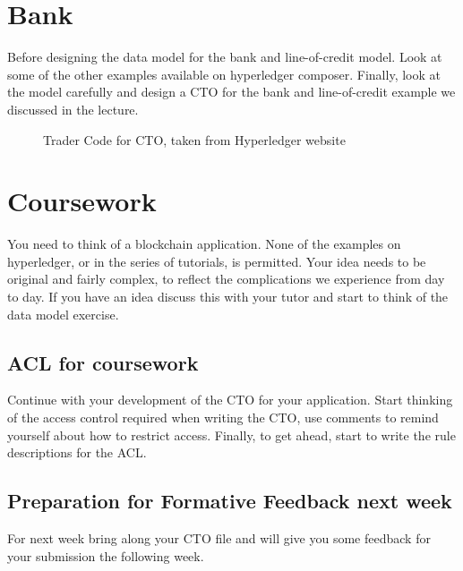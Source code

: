\section{Bank}
Before designing the data model for the bank and line-of-credit model. Look at some of the other examples available on hyperledger composer. Finally, look at the model carefully and design a CTO for the bank and line-of-credit example we discussed in the lecture.
\begin{figure}\label{fi:traderCTO}
	
	\caption{Trader Code for CTO, taken from Hyperledger website}
\end{figure}


\section{Coursework}
You need to think of a blockchain application. None of the examples on hyperledger, or in the series of tutorials, is permitted. Your idea needs to be original and fairly complex, to reflect the complications we experience from day to day. If you have an idea discuss this with your tutor and start to think of the data model exercise. 

\subsection{ACL for coursework}
Continue with your development of the CTO for your application. Start thinking of the access control required when writing the CTO, use comments to remind yourself about how to restrict access. Finally, to get ahead, start to write the rule descriptions for the ACL.

\subsection{Preparation for Formative Feedback next week}
For next week bring along your CTO file and \moduleLeader will give you some feedback for your submission the following week.

